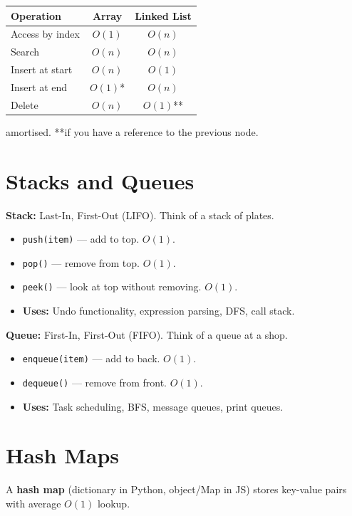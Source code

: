 \documentclass[12pt, a4paper, oneside]{book}
\begin{document}
\begin{center}
\begin{tabular}{l c c}
\toprule
\textbf{Operation} & \textbf{Array} & \textbf{Linked List} \\
\midrule
Access by index & $O(1)$ & $O(n)$ \\
Search & $O(n)$ & $O(n)$ \\
Insert at start & $O(n)$ & $O(1)$ \\
Insert at end & $O(1)$* & $O(n)$ \\
Delete & $O(n)$ & $O(1)$** \\
\bottomrule
\end{tabular}
\end{center}
{\small *amortised. **if you have a reference to the previous node.}

\section{Stacks and Queues}

\textbf{Stack:} Last-In, First-Out (LIFO). Think of a stack of plates.
\begin{itemize}[leftmargin=2em]
    \item \texttt{push(item)} --- add to top. $O(1)$.
    \item \texttt{pop()} --- remove from top. $O(1)$.
    \item \texttt{peek()} --- look at top without removing. $O(1)$.
    \item \textbf{Uses:} Undo functionality, expression parsing, DFS, call stack.
\end{itemize}

\textbf{Queue:} First-In, First-Out (FIFO). Think of a queue at a shop.
\begin{itemize}[leftmargin=2em]
    \item \texttt{enqueue(item)} --- add to back. $O(1)$.
    \item \texttt{dequeue()} --- remove from front. $O(1)$.
    \item \textbf{Uses:} Task scheduling, BFS, message queues, print queues.
\end{itemize}

\section{Hash Maps}

A \textbf{hash map} (dictionary in Python, object/Map in JS) stores key-value pairs with average $O(1)$ lookup.
\end{document}
